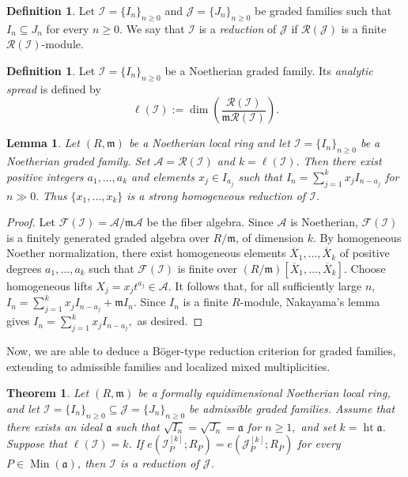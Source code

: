 \documentclass[reqno,12pt]{amsart}
\theoremstyle{plain}
\newtheorem{thm}[prop]{Theorem}
\newtheorem{lem}[prop]{Lemma}
\theoremstyle{definition}
\newtheorem{defn}[prop]{Definition}
\theoremstyle{remark}
\numberwithin{equation}{section}
\begin{document}
\begin{defn}
Let $\mathcal I=\{I_n\}_{n\geq0}$ and
$\mathcal J=\{J_n\}_{n\geq0}$ be graded families such that
$I_n\subseteq J_n$ for every $n\geq0$. We say that
$\mathcal I$ is a \emph{reduction} of $\mathcal J$ if
$\mathcal R(\mathcal J)$ is a finite
$\mathcal R(\mathcal I)$-module.
\end{defn}

\begin{defn}
Let $\mathcal I=\{I_n\}_{n\geq0}$ be a Noetherian graded family. Its
\emph{analytic spread} is defined by
\[
\ell(\mathcal I)
:=
\dim\!\left(
\frac{\mathcal R(\mathcal I)}
{\mathfrak m\mathcal R(\mathcal I)}
\right).
\]
\end{defn}

\begin{lem}
\label{lem:equimultiple-homogeneous-reduction}
Let $(R,\mathfrak m)$ be a Noetherian local ring and let
$\mathcal I=\{I_n\}_{n\geq0}$ be a Noetherian graded family.
Set $\mathcal A=\mathcal R(\mathcal I)$ and $k=\ell(\mathcal I).$
Then there exist positive integers $a_1,\ldots,a_k$ and elements
$x_j\in I_{a_j}$ such that $I_n
=
\sum_{j=1}^{k}x_jI_{n-a_j}$ for  $n\gg0.$
Thus $\{x_1,\ldots,x_k\}$ is a strong homogeneous reduction of
$\mathcal I$.
\end{lem}

\begin{proof}
Let
$\mathcal F(\mathcal I)
=\mathcal A/\mathfrak m\mathcal A$
be the fiber algebra. Since $\mathcal A$ is Noetherian,
$\mathcal F(\mathcal I)$ is a finitely generated graded algebra over
$R/\mathfrak m$, of dimension $k$. By homogeneous Noether
normalization, there exist homogeneous elements
$\overline X_1,\ldots,\overline X_k$ of positive degrees
$a_1,\ldots,a_k$ such that
$\mathcal F(\mathcal I)$ is finite over
$(R/\mathfrak m)[\overline X_1,\ldots,\overline X_k]$. Choose homogeneous lifts
$X_j=x_jt^{a_j}\in\mathcal A$.
It follows that, for all sufficiently large $n$, $I_n
=
\sum_{j=1}^{k}x_jI_{n-a_j}
+
\mathfrak m I_n.$
Since $I_n$ is a finite $R$-module, Nakayama's lemma gives $I_n
=
\sum_{j=1}^{k}x_jI_{n-a_j},$
as desired.
\end{proof}

Now, we are able to deduce a B\"oger-type reduction criterion for graded families,
extending \cite{Boger1969} to admissible families and localized mixed
multiplicities.
\begin{thm}
\label{thm:boger-graded-families}
Let $(R,\mathfrak m)$ be a formally equidimensional Noetherian local
ring, and let
$\mathcal I=\{I_n\}_{n\geq0}\subseteq
 \mathcal J=\{J_n\}_{n\geq0}$
be admissible graded families. Assume that there exists an ideal
$\mathfrak a$ such that $\sqrt{I_n}=\sqrt{J_n}=\mathfrak a$ for
$n\geq1,$
and set $k=\operatorname{ht}\mathfrak a$. Suppose that $\ell(\mathcal I)=k.$ If $e\!\left(\mathcal I_P^{[k]};R_P\right)
=
e\!\left(\mathcal J_P^{[k]};R_P\right)$
for every $P\in\operatorname{Min}(\mathfrak a)$, then
$\mathcal I$ is a reduction of $\mathcal J$.
\end{thm}
\end{document}
